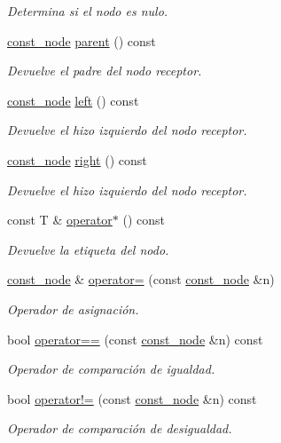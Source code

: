 \begin{DoxyCompactItemize}
\begin{DoxyCompactList}\small\item\em Determina si el nodo es nulo. \end{DoxyCompactList}\item 
\hyperlink{classbintree_1_1const__node}{const\+\_\+node} \hyperlink{classbintree_1_1const__node_ab7ea1bdf5af7b4ef38a0e1f18cd32c79}{parent} () const 
\begin{DoxyCompactList}\small\item\em Devuelve el padre del nodo receptor. \end{DoxyCompactList}\item 
\hyperlink{classbintree_1_1const__node}{const\+\_\+node} \hyperlink{classbintree_1_1const__node_ac7d405aa47245cd42854eb1b9afcd1f5}{left} () const 
\begin{DoxyCompactList}\small\item\em Devuelve el hizo izquierdo del nodo receptor. \end{DoxyCompactList}\item 
\hyperlink{classbintree_1_1const__node}{const\+\_\+node} \hyperlink{classbintree_1_1const__node_a7e86d4987f8a8b9844fcc53a9205ae30}{right} () const 
\begin{DoxyCompactList}\small\item\em Devuelve el hizo izquierdo del nodo receptor. \end{DoxyCompactList}\item 
const T \& \hyperlink{classbintree_1_1const__node_a2aaf8e239d0d763e2fc0ecb3425c1b5a}{operator$\ast$} () const 
\begin{DoxyCompactList}\small\item\em Devuelve la etiqueta del nodo. \end{DoxyCompactList}\item 
\hyperlink{classbintree_1_1const__node}{const\+\_\+node} \& \hyperlink{classbintree_1_1const__node_a15de7a0172cadeafc839d4a6c2631edb}{operator=} (const \hyperlink{classbintree_1_1const__node}{const\+\_\+node} \&n)
\begin{DoxyCompactList}\small\item\em Operador de asignación. \end{DoxyCompactList}\item 
bool \hyperlink{classbintree_1_1const__node_aed0108be5dccd63aa8accb0eb42ef5b3}{operator==} (const \hyperlink{classbintree_1_1const__node}{const\+\_\+node} \&n) const 
\begin{DoxyCompactList}\small\item\em Operador de comparación de igualdad. \end{DoxyCompactList}\item 
bool \hyperlink{classbintree_1_1const__node_a75a32333580dd26be46d4f9d5e9818d8}{operator!=} (const \hyperlink{classbintree_1_1const__node}{const\+\_\+node} \&n) const 
\begin{DoxyCompactList}\small\item\em Operador de comparación de desigualdad. \end{DoxyCompactList}\end{DoxyCompactItemize}

